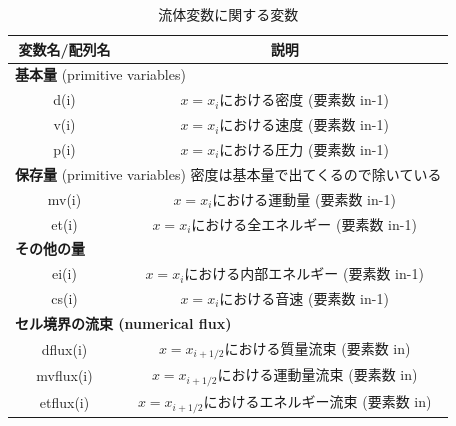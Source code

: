 \begin{table}[h]
\begin{center}
\caption{流体変数に関する変数}
\begin{tabular}{|c|c|}
    \hline
    変数名/配列名 & 説明 \\
    \hline
    \hline
    \multicolumn{2}{|l|}{ {\bf 基本量} (primitive variables)} \\
    \hline
    {\ttfamily d(i)} & $x=x_i$における密度 (要素数 {\ttfamily in-1}) \\
    \hline
    {\ttfamily v(i)} & $x=x_i$における速度 (要素数 {\ttfamily in-1}) \\
    \hline
    {\ttfamily p(i)} & $x=x_i$における圧力 (要素数 {\ttfamily in-1}) \\
    \hline
    \multicolumn{2}{|l|}{ {\bf 保存量} (primitive variables) {\footnotesize 密度は基本量で出てくるので除いている}} \\
    \hline
    {\ttfamily mv(i)} & $x=x_i$における運動量 (要素数 {\ttfamily in-1}) \\
    \hline
    {\ttfamily et(i)} & $x=x_i$における全エネルギー (要素数 {\ttfamily in-1}) \\
    \hline
    \multicolumn{2}{|l|}{\bf その他の量} \\
    \hline
    {\ttfamily ei(i)} & $x=x_i$における内部エネルギー (要素数 {\ttfamily in-1}) \\
    \hline
    {\ttfamily cs(i)} & $x=x_i$における音速 (要素数 {\ttfamily in-1}) \\
    \hline
    \multicolumn{2}{|l|}{\bf セル境界の流束 (numerical flux)} \\
    \hline
    {\ttfamily dflux(i)} & $x=x_{i+1/2}$における質量流束 (要素数 {\ttfamily in}) \\
    \hline
    {\ttfamily mvflux(i)} & $x=x_{i+1/2}$における運動量流束 (要素数 {\ttfamily in}) \\
    \hline
    {\ttfamily etflux(i)} & $x=x_{i+1/2}$におけるエネルギー流束 (要素数 {\ttfamily in}) \\
    \hline
\end{tabular}
\end{center}
\end{table}






